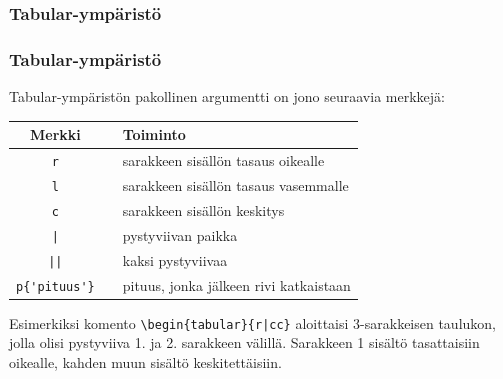 \subsubsection{Tabular-ympäristö}
\begin{frame}[fragile]
    \frametitle{Tabular-ympäristö}
    Tabular-ympäristön pakollinen argumentti on jono seuraavia merkkejä:
    \begin{table}[h!]
        \begin{scriptsize}
            \begin{tabular}{ccp{5cm}}
                Merkki && Toiminto\\
                \hline
                \verb-r- && sarakkeen sisällön tasaus oikealle\\
                \hline
                \verb-l- && sarakkeen sisällön tasaus vasemmalle\\
                \hline
                \verb-c- && sarakkeen sisällön keskitys\\
                \hline
                \verb-|- && pystyviivan paikka\\
                \hline
                \verb-||- && kaksi pystyviivaa\\
                \hline
                \verb-p{'pituus'}- && pituus, jonka jälkeen rivi katkaistaan\\
                \hline
            \end{tabular}
        \end{scriptsize}
    \end{table}
    Esimerkiksi komento \verb-\begin{tabular}{r|cc}- aloittaisi 3-sarakkeisen taulukon, jolla olisi pystyviiva 1. ja 2. sarakkeen välillä. Sarakkeen 1 sisältö tasattaisiin oikealle, kahden muun sisältö keskitettäisiin.
\end{frame}

